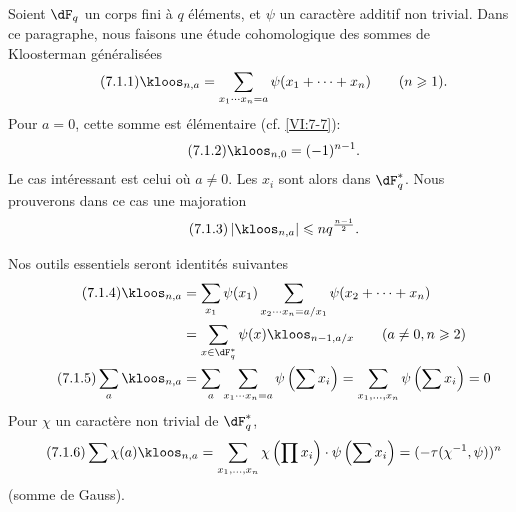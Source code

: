 \subsection{}\label{VI:7-1}

Soient $\dF_q$ un corps fini à $q$ éléments, et $\psi$ un caractère 
additif non trivial. Dans ce paragraphe, nous faisons une étude cohomologique 
des sommes de Kloosterman généralisées 
\begin{equation*}\tag{7.1.1}\label{VI:eq:7-1-1}
  \kloos_{n,a} = \sum_{x_1\dotsm x_n = a} \psi(x_1+\cdots + x_n) \qquad (n\geqslant 1) \text{.} 
\end{equation*}
Pour $a=0$, cette somme est élémentaire (cf. \ref{VI:7-7}): 
\begin{equation*}\tag{7.1.2}\label{VI:eq:7-1-2}
  \kloos_{n,0} = (-1)^{n-1} \text{.} 
\end{equation*}
Le cas intéressant est celui où $a\ne 0$. Les $x_i$ sont alors dans 
$\dF_q^\ast$. Nous prouverons dans ce cas une majoration 
\begin{equation*}\tag{7.1.3}\label{VI:eq:7-1-3}
  \left|\kloos_{n,a}\right| \leqslant n q^{\frac{n-1}{2}} \text{.} 
\end{equation*}

Nos outils essentiels seront  
identités suivantes 
\begin{align*}\tag{7.1.4}\label{VI:eq:7-1-4}
  \kloos_{n,a} &= \sum_{x_1} \psi(x_1) \sum_{x_2\dotsm x_n = a/x_1} \psi(x_2+\cdots + x_n) \\ \notag
    &= \sum_{x\in \dF_q^\ast} \psi(x) \kloos_{n-1,a/x} \qquad (a\ne 0,n\geqslant 2) \\ \tag{7.1.5}\label{VI:eq:7-1-5}
  \sum_a \kloos_{n,a} &= \sum_a \sum_{x_1 \dotsm x_n = a} \psi\left(\sum x_i\right) = \sum_{x_1,\dots,x_n} \psi\left(\sum x_i\right) = 0 
\end{align*}
Pour $\chi$ un caractère non trivial de $\dF_q^\ast$, 
\begin{equation*}\tag{7.1.6}\label{VI:eq:7-1-6}
  \sum \chi(a) \kloos_{n,a} = \sum_{x_1,\dots,x_n} \chi\left(\prod x_i\right) \cdot \psi\left(\sum x_i\right) = (-\tau(\chi^{-1},\psi))^n 
\end{equation*}
(somme de Gauss). 





\subsection{}\label{VI:7-2}

